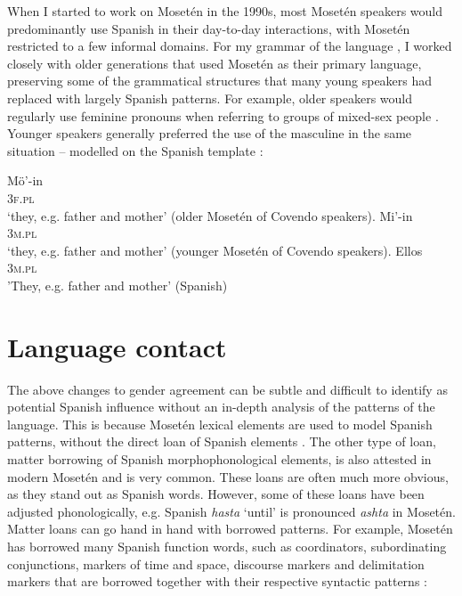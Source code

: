 \documentclass[output=paper,colorlinks,citecolor=brown
]{langscibook}
\begin{document}
When I started to work on Mosetén in the 1990s, most Mosetén speakers would predominantly use Spanish in their day-to-day interactions, with Mosetén restricted to a few informal domains. For my grammar of the language \citep{sakel2004grammar}, I worked closely with older generations that used Mosetén as their primary language, preserving some of the grammatical structures that many young speakers had replaced with largely Spanish patterns. For example, older speakers would regularly use feminine pronouns when referring to groups of mixed-sex people . Younger speakers generally preferred the use of the masculine in the same situation  – modelled on the Spanish template :

\ea \label{sakel_example_1}
\gll Mö'-in\\
     3\textsc{f}.\textsc{pl}\\
\glt `they, e.g. father and mother' (older Mosetén of Covendo speakers).
\z
\ea \label{sakel_example_2}
\gll Mi'-in\\
     3\textsc{m}.\textsc{pl}\\
\glt `they, e.g. father and mother' (younger Mosetén of Covendo speakers).
\z
\ea \label{sakel_example_3}
\gll Ellos\\
     3\textsc{m}.\textsc{pl}\\
\glt 'They, e.g. father and mother' (Spanish)
\z
{} %

\section{Language contact}
The above changes to gender agreement can be subtle and difficult to identify as potential Spanish influence without an in-depth analysis of the patterns of the language. This is because Mosetén lexical elements are used to model Spanish patterns, without the direct loan of Spanish elements \citep{matras2007grammatical, matras2007investigating}. The other type of loan, matter borrowing of Spanish morphophonological elements, is also attested in modern Mosetén and is very common. These loans are often much more obvious, as they stand out as Spanish words. However, some of these loans have been adjusted phonologically, e.g. Spanish \textit{hasta} ‘until’ is pronounced \textit{ashta} in Mosetén. Matter loans can go hand in hand with borrowed patterns. For example, Mosetén has borrowed many Spanish function words, such as coordinators, subordinating conjunctions, markers of time and space, discourse markers and delimitation markers that are borrowed together with their respective syntactic patterns \citep{sakel2007language, sakel2007moseten}:
\end{document}
